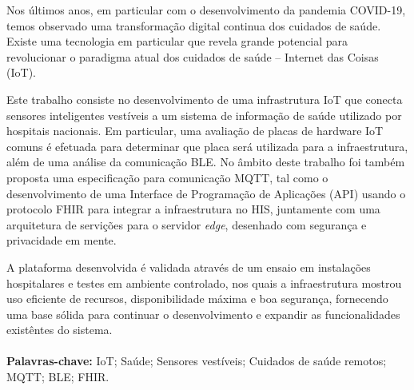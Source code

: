 \vspace{1cm}
\noindent

Nos últimos anos, em particular com o desenvolvimento da pandemia COVID-19, temos observado uma transformação digital continua dos cuidados de saúde. Existe uma tecnologia em particular que revela grande potencial para revolucionar o paradigma atual dos cuidados de saúde -- Internet das Coisas (\acs{IoT}).

Este trabalho consiste no desenvolvimento de uma infrastrutura \acs{IoT} que conecta sensores inteligentes vestíveis a um sistema de informação de saúde utilizado por hospitais nacionais. Em particular, uma avaliação de placas de hardware \acs{IoT} comuns é efetuada para determinar que placa será utilizada para a infraestrutura, além de uma análise da comunicação \acf{BLE}. No âmbito deste trabalho foi também proposta uma especificação para comunicação \acf{MQTT}, tal como o desenvolvimento de uma Interface de Programação de Aplicações (\acs{API}) usando o protocolo \acf{FHIR} para integrar a infraestrutura no \acs{HIS}, juntamente com uma arquitetura de servições para o servidor \textit{edge}, desenhado com segurança e privacidade em mente.

A plataforma desenvolvida é validada através de um ensaio em instalações hospitalares e testes em ambiente controlado, nos quais a infraestrutura mostrou uso eficiente de recursos, disponibilidade máxima e boa segurança, fornecendo uma base sólida para continuar o desenvolvimento e expandir as funcionalidades existêntes do sistema.


\paragraph{}\textbf{Palavras-chave:} IoT; Saúde; Sensores vestíveis; Cuidados de saúde remotos; MQTT; BLE; FHIR.